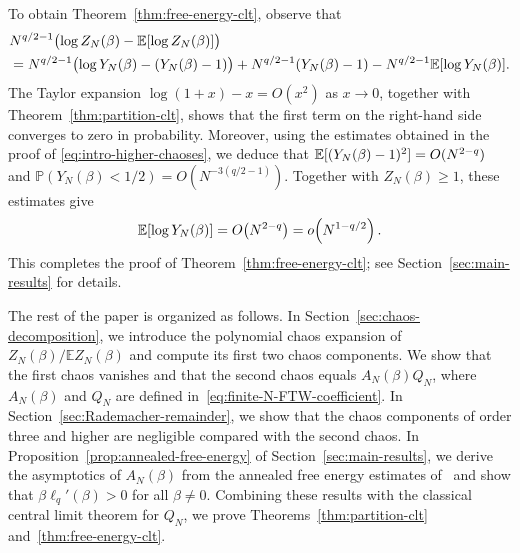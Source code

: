 \documentclass[../CLT_SYK.tex]{subfiles}
\begin{document}
To obtain Theorem~\ref{thm:free-energy-clt}, observe that
\begin{align*}
  &N^{q/2-1}\bigl(\log Z_N(\beta)-\mathbb E[\log Z_N(\beta)]\bigr)\\
  &=N^{q/2-1}\bigl(\log Y_N(\beta)-(Y_N(\beta)-1)\bigr)
   +N^{q/2-1}(Y_N(\beta)-1)-N^{q/2-1}\mathbb E[\log Y_N(\beta)].
\end{align*}
The Taylor expansion $\log(1+x)-x=O(x^2)$ as $x \to 0$, together with Theorem~\ref{thm:partition-clt}, shows that the first term  on the right-hand side converges to zero in probability. Moreover, using the estimates obtained in the proof of \eqref{eq:intro-higher-chaoses}, we deduce that $\mathbb E[(Y_N(\beta)-1)^2]=O(N^{2-q})$ and
$\mathbb P(Y_N(\beta)<1/2)=O(N^{-3(q/2-1)})$. Together with
$Z_N(\beta)\geq1$, these estimates give
\[
  \mathbb E[\log Y_N(\beta)]=O\!\left(N^{2-q}\right)
  =o\!\left(N^{1-q/2}\right).
\]
This completes the proof of Theorem~\ref{thm:free-energy-clt}; see Section~\ref{sec:main-results} for details.

{The rest of the paper is organized as follows. In
Section~\ref{sec:chaos-decomposition}, we introduce the polynomial chaos expansion
of $Z_N(\beta)/\mathbb E Z_N(\beta)$ and compute its first two chaos components. We show that the first
chaos vanishes and that the second chaos equals $A_N(\beta)Q_N$, where $A_N(\beta)$ and $Q_N$ 
are defined in~\eqref{eq:finite-N-FTW-coefficient}. In
Section~\ref{sec:Rademacher-remainder}, we show that the chaos components of order
three and higher are negligible compared with the second chaos. In Proposition~\ref{prop:annealed-free-energy} of Section~\ref{sec:main-results},
we derive the asymptotics of $A_N(\beta)$ from the annealed free energy
estimates of~\cite{He2026} and show that $\beta\ell_q'(\beta)>0$ for all
$\beta\neq 0$.  Combining these results with the classical central limit theorem for $Q_N$, we prove
Theorems~\ref{thm:partition-clt} and~\ref{thm:free-energy-clt}.}
\end{document}
